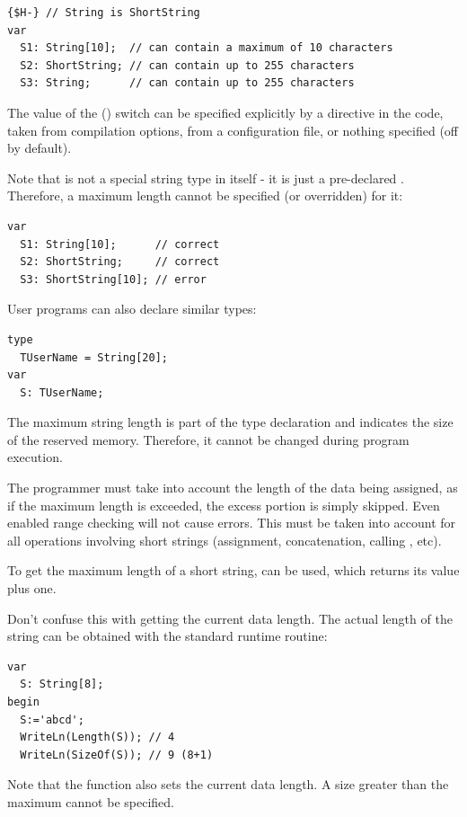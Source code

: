 \begin{verbatim}
{$H-} // String is ShortString
var
  S1: String[10];  // can contain a maximum of 10 characters
  S2: ShortString; // can contain up to 255 characters
  S3: String;      // can contain up to 255 characters
\end{verbatim}

\begin{remark}
The value of the  () switch can be
specified explicitly by a directive in the code, taken from compilation
options, from a configuration file, or nothing specified (off by default).
\end{remark}

\begin{remark}
Note that  is not a special string type in
itself - it is just a pre-declared .
Therefore, a maximum length cannot be specified (or overridden) for it:
\begin{verbatim}
var
  S1: String[10];      // correct
  S2: ShortString;     // correct
  S3: ShortString[10]; // error
\end{verbatim}
User programs can also declare similar types:
\begin{verbatim}
type
  TUserName = String[20];
var
  S: TUserName;
\end{verbatim}
\end{remark}

The maximum string length is part of the type declaration and indicates the size
of the reserved memory. Therefore, it cannot be changed during program execution.

The programmer must take into account the length of the data being assigned,
as if the maximum length is exceeded, the excess portion is simply skipped.
Even enabled range checking will not cause errors.
This must be taken into account for all operations involving short strings
(assignment, concatenation, calling , etc).

To get the maximum length of a short string,  can be used,
which returns its value plus one.

Don't confuse this with getting the current data length. The actual length
of the string can be obtained with the  standard runtime routine:
\begin{verbatim}
var
  S: String[8];
begin
  S:='abcd';
  WriteLn(Length(S)); // 4
  WriteLn(SizeOf(S)); // 9 (8+1)
\end{verbatim}
Note that the  function also sets the current data length.
A size greater than the maximum cannot be specified.

